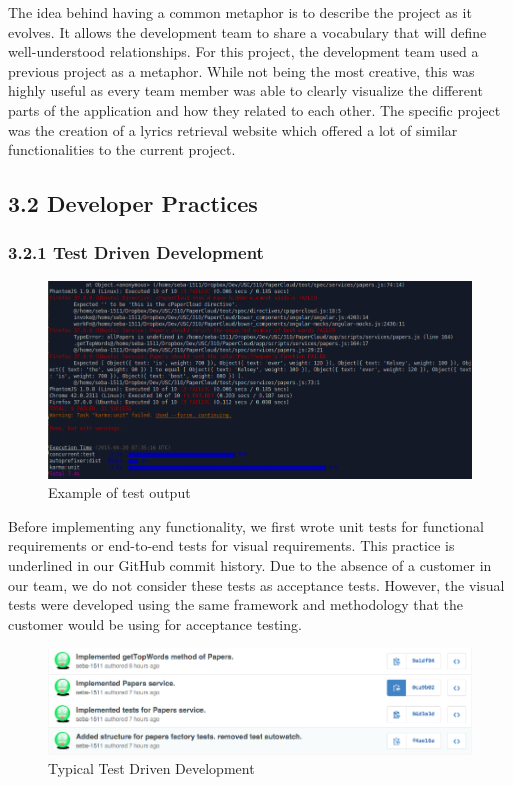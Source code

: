 \documentclass[]{article}
\begin{document}
The idea behind having a common metaphor is to describe the project as
it evolves. It allows the development team to share a vocabulary that
will define well-understood relationships. For this project, the
development team used a previous project as a metaphor. While not being
the most creative, this was highly useful as every team member was able
to clearly visualize the different parts of the application and how they
related to each other. The specific project was the creation of a lyrics
retrieval website which offered a lot of similar functionalities to the
current project.

\subsection{3.2 Developer Practices}\label{developer-practices}

\subsubsection{3.2.1 Test Driven
Development}\label{test-driven-development}

\begin{figure}[htbp]
\centering
\includegraphics{test_output.png}
\caption{Example of test output}
\end{figure}

Before implementing any functionality, we first wrote unit tests for
functional requirements or end-to-end tests for visual requirements.
This practice is underlined in our GitHub commit history. Due to the absence of a customer in our team,
we do not consider these tests as acceptance tests. However, the visual
tests were developed using the same framework and methodology that the
customer would be using for acceptance testing.

\begin{figure}[htbp]
\centering
\includegraphics{tdd_proof.png}
\caption{Typical Test Driven Development}
\end{figure}
\end{document}
